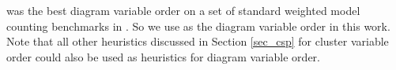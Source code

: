 \Mcs{} was the best diagram variable order on a set of standard weighted model counting benchmarks in \cite{dudek2020addmc}.
So we use \Mcs{} as the diagram variable order in this work.
Note that all other heuristics discussed in Section \ref{sec_csp} for cluster variable order could also be used as heuristics for diagram variable order.

